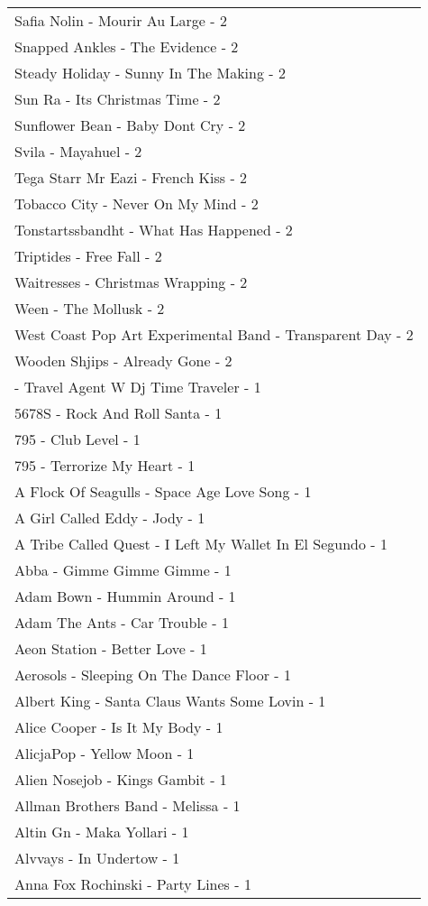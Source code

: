 \documentclass[
]{article}
\begin{document}
\begin{longtable}{l}
Safia Nolin - Mourir Au Large - 2 \\ 
Snapped Ankles - The Evidence - 2 \\ 
Steady Holiday - Sunny In The Making - 2 \\ 
Sun Ra - Its Christmas Time - 2 \\ 
Sunflower Bean - Baby Dont Cry - 2 \\ 
Svila - Mayahuel - 2 \\ 
Tega Starr Mr Eazi - French Kiss - 2 \\ 
Tobacco City - Never On My Mind - 2 \\ 
Tonstartssbandht - What Has Happened - 2 \\ 
Triptides - Free Fall - 2 \\ 
Waitresses - Christmas Wrapping - 2 \\ 
Ween - The Mollusk - 2 \\ 
West Coast Pop Art Experimental Band - Transparent Day - 2 \\ 
Wooden Shjips - Already Gone - 2 \\ 
 - Travel Agent W Dj Time Traveler - 1 \\ 
5678S - Rock And Roll Santa - 1 \\ 
795 - Club Level - 1 \\ 
795 - Terrorize My Heart - 1 \\ 
A Flock Of Seagulls - Space Age Love Song - 1 \\ 
A Girl Called Eddy - Jody - 1 \\ 
A Tribe Called Quest - I Left My Wallet In El Segundo - 1 \\ 
Abba - Gimme Gimme Gimme - 1 \\ 
Adam Bown - Hummin Around - 1 \\ 
Adam The Ants - Car Trouble - 1 \\ 
Aeon Station - Better Love - 1 \\ 
Aerosols - Sleeping On The Dance Floor - 1 \\ 
Albert King - Santa Claus Wants Some Lovin - 1 \\ 
Alice Cooper - Is It My Body - 1 \\ 
AlicjaPop - Yellow Moon - 1 \\ 
Alien Nosejob - Kings Gambit - 1 \\ 
Allman Brothers Band - Melissa - 1 \\ 
Altin Gn - Maka Yollari - 1 \\ 
Alvvays - In Undertow - 1 \\ 
Anna Fox Rochinski - Party Lines - 1 \\ 

\end{longtable}
\end{document}
